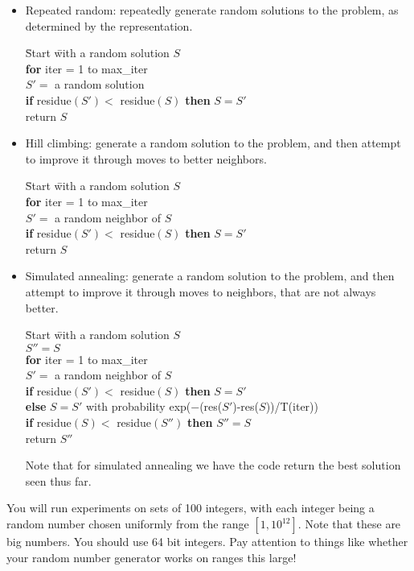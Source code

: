 \documentclass[11pt]{article}
\begin{document}
\begin{itemize}
\item Repeated random:  repeatedly generate random solutions
to the problem, as determined by the representation.
\smallskip
\begin{tabbing}
\quad \quad \quad \= Start \= with a random solution $S$ \\
\> {\bf for} iter = 1 to max\_iter \\
\> \> $S' =$ a random solution \\
\> \> {\bf if} residue$(S') <$ residue$(S)$ {\bf then} $S = S'$ \\
\> return $S$
\end{tabbing}
\smallskip
\item Hill climbing:  generate a random solution to the problem, and
then attempt to improve it through moves to better neighbors.
\smallskip
\begin{tabbing}
\quad \quad \quad \= Start \= with a random solution $S$ \\
\> {\bf for} iter = 1 to max\_iter \\
\> \> $S' =$ a random neighbor of $S$ \\
\> \> {\bf if} residue$(S') <$ residue$(S)$ {\bf then} $S = S'$ \\
\> return $S$
\end{tabbing}
\smallskip
\item Simulated annealing:  generate a random solution to the problem, and
then attempt to improve it through moves to neighbors, that are not always 
better.
\begin{tabbing}
\quad \quad \quad \= Start \= with a random solution $S$ \\
\> $S'' = S$ \\
\> {\bf for} iter = 1 to max\_iter \\
\> \> $S' =$ a random neighbor of $S$ \\
\> \> {\bf if} residue$(S') <$ residue$(S)$ {\bf then} $S = S'$ \\
\> \> {\bf else} $S = S'$ with probability exp($-$(res($S'$)-res($S$))/T(iter))\\
\> \> {\bf if} residue$(S) <$ residue$(S'')$ {\bf then} $S'' = S$ \\
\> return $S''$
\end{tabbing}
\smallskip
Note that for simulated annealing we have the code return the best
solution seen thus far.
\end{itemize}

You will run experiments on sets of 100 integers, with each integer
being a random number chosen uniformly from the range $[1,10^{12}]$.
Note that these are big numbers.  You should use 64 bit integers.  Pay
attention to things like whether your random number generator works on
ranges this large!
\end{document}
